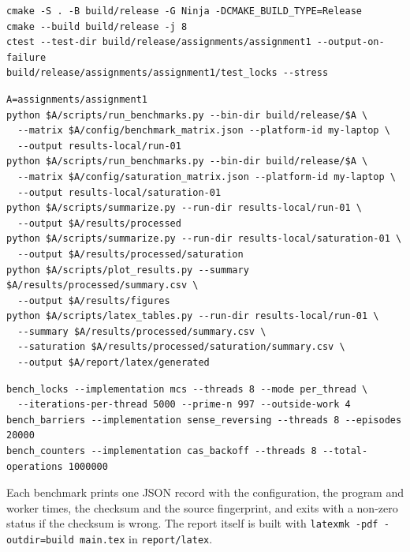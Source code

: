 \begin{lstlisting}[language={},numbers=none,caption={Build and correctness tests.}]
cmake -S . -B build/release -G Ninja -DCMAKE_BUILD_TYPE=Release
cmake --build build/release -j 8
ctest --test-dir build/release/assignments/assignment1 --output-on-failure
build/release/assignments/assignment1/test_locks --stress
\end{lstlisting}

\begin{lstlisting}[language={},numbers=none,caption={Benchmarks, summary, figures and report tables.}]
A=assignments/assignment1
python $A/scripts/run_benchmarks.py --bin-dir build/release/$A \
  --matrix $A/config/benchmark_matrix.json --platform-id my-laptop \
  --output results-local/run-01
python $A/scripts/run_benchmarks.py --bin-dir build/release/$A \
  --matrix $A/config/saturation_matrix.json --platform-id my-laptop \
  --output results-local/saturation-01
python $A/scripts/summarize.py --run-dir results-local/run-01 \
  --output $A/results/processed
python $A/scripts/summarize.py --run-dir results-local/saturation-01 \
  --output $A/results/processed/saturation
python $A/scripts/plot_results.py --summary $A/results/processed/summary.csv \
  --output $A/results/figures
python $A/scripts/latex_tables.py --run-dir results-local/run-01 \
  --summary $A/results/processed/summary.csv \
  --saturation $A/results/processed/saturation/summary.csv \
  --output $A/report/latex/generated
\end{lstlisting}

\begin{lstlisting}[language={},numbers=none,caption={Single benchmark runs with the statement's parameters.}]
bench_locks --implementation mcs --threads 8 --mode per_thread \
  --iterations-per-thread 5000 --prime-n 997 --outside-work 4
bench_barriers --implementation sense_reversing --threads 8 --episodes 20000
bench_counters --implementation cas_backoff --threads 8 --total-operations 1000000
\end{lstlisting}

Each benchmark prints one JSON record with the configuration, the program and worker times, the checksum and the source fingerprint, and exits with a non-zero status if the checksum is wrong. The report itself is built with \texttt{latexmk -pdf -outdir=build main.tex} in \texttt{report/latex}.
